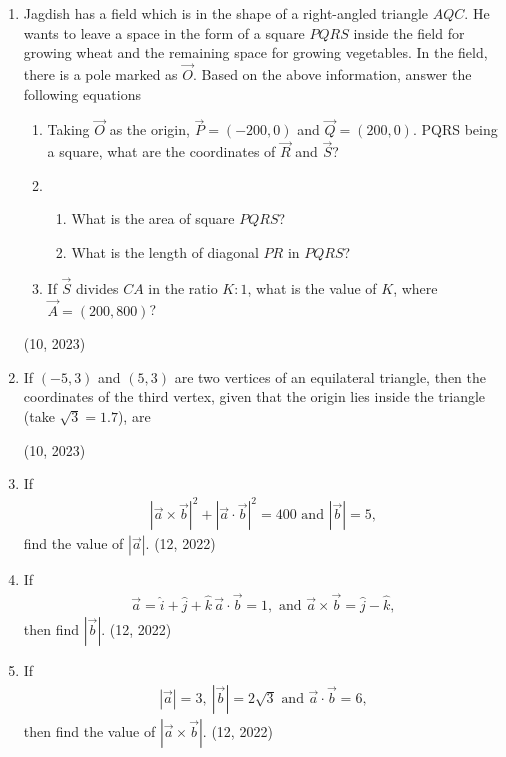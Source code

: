 \begin{enumerate}[label=\thesubsection.\arabic*,ref=\thesubsection.\theenumi]
    \item Jagdish has a field which is in the shape of a right-angled triangle $ AQC $. He wants to leave a space in the form of a square $ PQRS $ inside the field for growing wheat and the remaining space for growing vegetables.  In the field, there is a pole marked as $ \vec{O} $.
    Based on the above information, answer the following equations
    \begin{enumerate}
        \item Taking $ \vec{O} $ as the origin, $ \vec{P} = (-200,0) $ and  $ \vec{Q} = (200,0) $. PQRS being a square, what are the coordinates of $ \vec{R} $ and $ \vec{S} $?
        \item
        \begin{enumerate}
            \item What is the area of square $ PQRS $?
            \item What is the length of diagonal $ PR $ in $ PQRS $?
        \end{enumerate}
        \item If $ \vec{S} $ divides $ CA $ in the ratio $ K:1 $, what is the value of $ K $, where $ \vec{A} = (200,800) $?
    \end{enumerate}
    \hfill (10, 2023)
    \item If $(-5,3)$ and $(5,3)$ are two vertices of an equilateral triangle, then the coordinates of the third vertex, given that the origin lies inside the triangle (take $\sqrt{3} = 1.7$), are

    \hfill (10, 2023)
    \item If
    \begin{align*}
        \left| \overrightarrow{a} \times \overrightarrow{b} \right|^2 + \left| \overrightarrow{a} \cdot \overrightarrow{b} \right|^2 = 400
	    \text{ and }
        \left| \overrightarrow{b} \right| = 5,
    \end{align*}
    find the value of $\left| \overrightarrow{a} \right|$.
    \hfill (12, 2022)
    \item If
    \begin{align*}
        \overrightarrow{a} = \hat{i} + \hat{j} + \hat{k}\,
        \overrightarrow{a} \cdot \overrightarrow{b} = 1,
	    \text{ and }
        \overrightarrow{a} \times \overrightarrow{b} = \hat{j} - \hat{k},
    \end{align*}
    then find $\left| \overrightarrow{b} \right|$.
    \hfill (12, 2022)
    \item If
    \begin{align*}
        \left| \overrightarrow{a} \right| = 3,\
        \left| \overrightarrow{b} \right| = 2\sqrt{3}
	    \text{ and }
        \overrightarrow{a} \cdot \overrightarrow{b} = 6,
    \end{align*}
    then find the value of $\left| \overrightarrow{a} \times \overrightarrow{b} \right|$.
    \hfill (12, 2022)


\end{enumerate}
